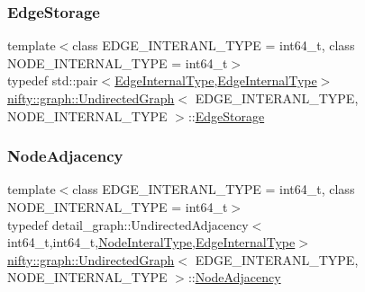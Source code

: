 \subsubsection{\texorpdfstring{Edge\+Storage}{EdgeStorage}}
{\footnotesize\ttfamily template$<$class E\+D\+G\+E\+\_\+\+I\+N\+T\+E\+R\+A\+N\+L\+\_\+\+T\+Y\+PE = int64\+\_\+t, class N\+O\+D\+E\+\_\+\+I\+N\+T\+E\+R\+N\+A\+L\+\_\+\+T\+Y\+PE = int64\+\_\+t$>$ \\
typedef std\+::pair$<$\hyperlink{classnifty_1_1graph_1_1UndirectedGraph_a70e38582c25deca5e0ce080277cb30fc}{Edge\+Internal\+Type},\hyperlink{classnifty_1_1graph_1_1UndirectedGraph_a70e38582c25deca5e0ce080277cb30fc}{Edge\+Internal\+Type}$>$ \hyperlink{classnifty_1_1graph_1_1UndirectedGraph}{nifty\+::graph\+::\+Undirected\+Graph}$<$ E\+D\+G\+E\+\_\+\+I\+N\+T\+E\+R\+A\+N\+L\+\_\+\+T\+Y\+PE, N\+O\+D\+E\+\_\+\+I\+N\+T\+E\+R\+N\+A\+L\+\_\+\+T\+Y\+PE $>$\+::\hyperlink{classnifty_1_1graph_1_1UndirectedGraph_a77256cc943f931180bf84b14d943f39a}{Edge\+Storage}\hspace{0.3cm}{\ttfamily [protected]}}

\mbox{\label{classnifty_1_1graph_1_1UndirectedGraph_ab50d4774bd9a93ac226589352866df69}} 
\subsubsection{\texorpdfstring{Node\+Adjacency}{NodeAdjacency}}
{\footnotesize\ttfamily template$<$class E\+D\+G\+E\+\_\+\+I\+N\+T\+E\+R\+A\+N\+L\+\_\+\+T\+Y\+PE = int64\+\_\+t, class N\+O\+D\+E\+\_\+\+I\+N\+T\+E\+R\+N\+A\+L\+\_\+\+T\+Y\+PE = int64\+\_\+t$>$ \\
typedef detail\+\_\+graph\+::\+Undirected\+Adjacency$<$int64\+\_\+t,int64\+\_\+t,\hyperlink{classnifty_1_1graph_1_1UndirectedGraph_aa3b43dd44281416b7232caae529e8780}{Node\+Interal\+Type},\hyperlink{classnifty_1_1graph_1_1UndirectedGraph_a70e38582c25deca5e0ce080277cb30fc}{Edge\+Internal\+Type}$>$ \hyperlink{classnifty_1_1graph_1_1UndirectedGraph}{nifty\+::graph\+::\+Undirected\+Graph}$<$ E\+D\+G\+E\+\_\+\+I\+N\+T\+E\+R\+A\+N\+L\+\_\+\+T\+Y\+PE, N\+O\+D\+E\+\_\+\+I\+N\+T\+E\+R\+N\+A\+L\+\_\+\+T\+Y\+PE $>$\+::\hyperlink{classnifty_1_1graph_1_1UndirectedGraph_ab50d4774bd9a93ac226589352866df69}{Node\+Adjacency}\hspace{0.3cm}{\ttfamily [protected]}}

